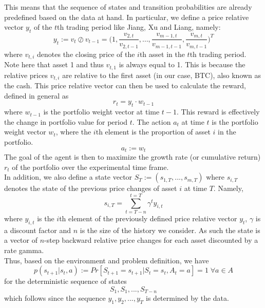 \documentclass[a4paper,12pt]{article}
\begin{document}
This means that the sequence of states and transition probabilities are already predefined based on the data at hand. In particular, we define a price relative vector $y_t$ of the $t$th trading period like Jiang, Xu and Liang, namely:
\begin{equation}
y_t := v_t \oslash v_{t-1} = \bigg(1,\frac{v_{2,t}}{v_{2,t-1}}, …,\frac{v_{m-1,t}}{v_{m-1,t-1}}, \frac{v_{m,t}}{v_{m,t-1}}\bigg)^T
\end{equation}
where $v_{t,i}$ denotes the closing price of the $i$th asset in the $t$th trading period. Note here that asset 1 and thus $v_{t,1}$ is always equal to 1. This is because the relative prices $v_{t,i}$ are relative to the first asset (in our case, BTC), also known as the cash. This price relative vector can then be used to calculate the reward, defined in general as 
\begin{equation}
r_t = y_t \cdot w_{t-1}
\end{equation}
where $w_{t-1}$ is the portfolio weight vector at time $t-1$. This reward is effectively the change in portfolio value for period $t$. The action $a_t$ at time $t$ is the portfolio weight vector $w_t$, where the $i$th element is the proportion of asset $i$ in the portfolio.
\begin{equation}
a_t := w_t
\end{equation}
The goal of the agent is then to maximize the growth rate (or cumulative return) $r_t$ of the portfolio over the experimental time frame. \\

In addition, we also define a state vector $S_T := (s_{1,T},...,s_{m,T})$ where $s_{i,T}$ denotes the state of the previous price changes of asset $i$ at time $T$. Namely,
\begin{equation}
s_{i,T} = \sum_{t=T-n}^{t=T} \gamma^t y_{i,t}
\end{equation}
where $y_{i,t}$ is the $i$th element of the previously defined price relative vector $y_t$, $\gamma$ is a discount factor and $n$ is the size of the history we consider. As such the state is a vector of $n$-step backward relative price changes for each asset discounted by a rate gamma. \\

Thus, based on the environment and problem definition, we have 
\begin{equation}
p(s_{t+1} | s_t,a) := Pr[S_{t+1}=s_{t+1} | S_t=s_t,A_t=a] = 1 \; \forall a \in A
\end{equation}
for the deterministic sequence of states
$$S_1,S_1,...,S_{T-n}$$
which follows since the sequence $y_1,y_2,...,y_T$ is determined by the data. \\
\end{document}
